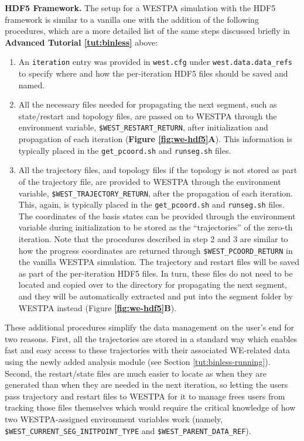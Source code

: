 \textbf{HDF5 Framework.} The setup for a WESTPA simulation with the HDF5 framework is similar to a vanilla one with the addition of the following procedures, which are a more detailed list of the same steps discussed briefly in \textbf{Advanced Tutorial \ref{tut:binless}} above:
\begin{enumerate}
    \item An \verb|iteration| entry was provided in \verb|west.cfg| under \verb|west.data.data_refs| to specify where and how the per-iteration HDF5 files should be saved and named. 
    \item All the necessary files needed for propagating the next segment, such as state/restart and topology files, are passed on to WESTPA through the environment variable, \verb|$WEST_RESTART_RETURN|, after initialization and propagation of each iteration (\textbf{Figure \ref{fig:we-hdf5}A}). 
    This information is typically placed in the \verb|get_pcoord.sh| and \verb|runseg.sh| files. 
    \item All the trajectory files, and topology files if the topology is not stored as part of the trajectory file, are provided to WESTPA through the environment variable, \verb|$WEST_TRAJECTORY_RETURN|, after the propagation of each iteration. 
    This, again, is typically placed in the \verb|get_pcoord.sh| and \verb|runseg.sh| files. 
    The coordinates of the basis states can be provided through the environment variable during initialization to be stored as the “trajectories” of the zero-th iteration. 
    Note that the procedures described in step 2 and 3 are similar to how the progress coordinates are returned through \verb|$WEST_PCOORD_RETURN| in the vanilla WESTPA simulation. 
    The trajectory and restart files will be saved as part of the per-iteration HDF5 files. 
    In turn, these files do not need to be located and copied over to the directory for propagating the next segment, and they will be automatically extracted and put into the segment folder by WESTPA instead (Figure \textbf{\ref{fig:we-hdf5}B}).
\end{enumerate}

These additional procedures simplify the data management on the user’s end for two reasons. 
First, all the trajectories are stored in a standard way which enables fast and easy access to these trajectories with their associated WE-related data using the newly added analysis module (see Section \ref{tut:binless-running}). 
Second, the restart/state files are much easier to locate as when they are generated than when they are needed in the next iteration, so letting the users pass trajectory and restart files to WESTPA for it to manage frees users from tracking those files themselves which would require the critical knowledge of how two WESTPA-assigned environment variables work (namely, \verb|$WEST_CURRENT_SEG_INITPOINT_TYPE| and \verb|$WEST_PARENT_DATA_REF|). 

